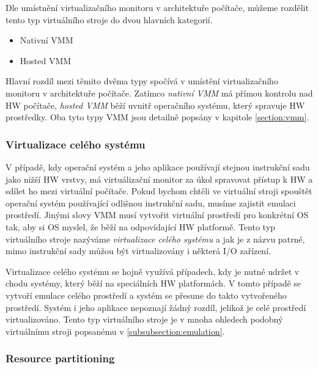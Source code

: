     Dle umístnění virtualizačního monitoru v architektuře počítače, můžeme rozdělit tento typ virtuálního stroje do dvou hlavních kategorií. 
    
    \begin{itemize}
     \item Nativní VMM
     \item Hosted VMM
    \end{itemize}

    Hlavní rozdíl mezi těmito dvěma typy spočívá v umístění virtualizačního monitoru v architektuře počítače. Zatímco \textit{nativní VMM} má přímou kontrolu nad HW počítače, \textit{hosted VMM} běží uvnitř operačního systému,
    který spravuje HW prostředky. Oba tyto typy VMM jsou detailně popsány v kapitole \ref{section:vmm}.
    
    \subsubsection*{Virtualizace celého systému}
    \label{subsubsection:whole_system_virtualization}
    
    V případě, kdy operační systém a jeho aplikace používají stejnou instrukční sadu jako nižší HW vrstvy, má virtuálizační monitor za úkol spravovat přístup k HW a sdílet ho mezi virtuální počítače. Pokud bychom chtěli
    ve virtuální stroji spouštět operační systém používající odlišnou instrukční sadu, musíme zajistit emulaci prostředí. Jinými slovy VMM musí vytvořit virtuální prostředí pro konkrétní OS tak, aby si OS myslel, že běží
    na odpovídající HW platformě. Tento typ virtuálního stroje nazýváme \textit{virtualizace celého systému} a jak je z názvu patrné, mimo instrukční sady můžou být virtualizovány i některá I/O zařízení.
    
    Virtualizace celého systému se hojně využívá případech, kdy je nutné udržet v chodu systémy, který běží na speciálních HW platformách. V tomto případě se vytvoří emulace celého prostředí a systém se přesune do
    takto vytvořeného prostředí. Systém i jeho aplikace nepoznají žádný rozdíl, jelikož je celé prostředí virtualizováno. Tento typ virtuálního stroje je v mnoha ohledech podobný virtuálnímu stroji popsanému v \ref{subsubsection:emulation}.
    
    \subsubsection*{Resource partitioning}
    \label{subsubsection:partitioning}
    
